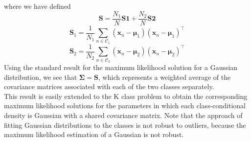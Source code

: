 \documentclass[twoside]{article}
\begin{document}
where we have defined
\begin{equation*}
    \textbf{S} = \frac{N_1}{N}\textbf{S1} + \frac{N_2}{N}\textbf{S2}
\end{equation*}
\begin{equation*}
    \textbf{S}_1 = \frac{1}{N_1}\sum\limits_{n \in \mathcal{C}_1}(\boldsymbol{x}_n - \boldsymbol{\mu}_1)(\boldsymbol{x}_n - \boldsymbol{\mu}_1)^\intercal
\end{equation*}
\begin{equation*}
    \textbf{S}_2 = \frac{1}{N_2}\sum\limits_{n \in \mathcal{C}_2}(\boldsymbol{x}_n - \boldsymbol{\mu}_2)(\boldsymbol{x}_n - \boldsymbol{\mu}_2)^\intercal
\end{equation*}
Using the standard result for the maximum likelihood solution for a Gaussian distribution, we see that $\boldsymbol{\Sigma} = \textbf{S}$, which represents a weighted average of the covariance matrices associated with each of the two classes separately.\\
This result is easily extended to the K class problem to obtain the corresponding maximum likelihood solutions for the parameters in which each class-conditional density is Gaussian with a shared covariance matrix. Note that the approach of fitting Gaussian distributions to the classes is not robust to outliers, because the maximum likelihood estimation of a Gaussian is not robust.
\end{document}
